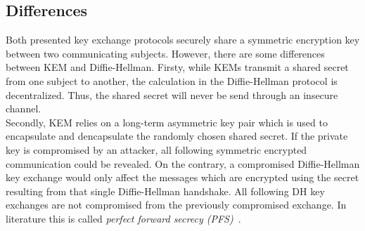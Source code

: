 \subsection{Differences}
Both presented key exchange protocols securely share a symmetric encryption key between two communicating subjects. However, there are some differences between KEM and Diffie-Hellman. Firsty, while KEMs transmit a shared secret from one subject to another, the calculation in the Diffie-Hellman protocol is decentralized. Thus, the shared secret will never be send through an insecure channel.\\
Secondly, KEM relies on a long-term asymmetric key pair which is used to encapsulate and dencapsulate the randomly chosen shared secret. If the private key is compromised by an attacker, all following symmetric encrypted communication could be revealed. On the contrary, a compromised Diffie-Hellman key exchange would only affect the messages which are encrypted using the secret resulting from that single Diffie-Hellman handshake. All following \gls{DH} key exchanges are not compromised from the previously compromised exchange. In literature this is called \textit{perfect forward secrecy (\gls{PFS})}~\parencite{ITSicherheit}.

